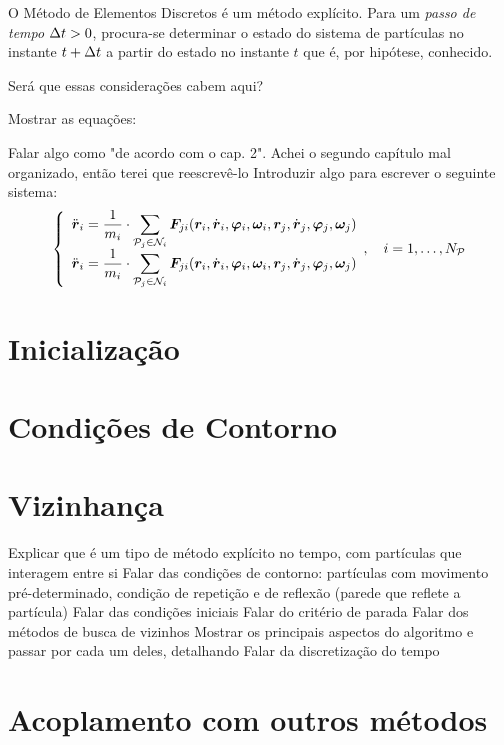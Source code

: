 O Método de Elementos Discretos é um método explícito. Para um \textit{passo de tempo} \(\Delta t>0\), procura-se determinar o estado do sistema de partículas no instante \(t+\Delta t\) a partir do estado no instante \(t\) que é, por hipótese, conhecido.

\alert{Será que essas considerações cabem aqui?}

\alert{Mostrar as equações:}

\alert{Falar algo como "de acordo com o cap. 2". Achei o segundo capítulo mal organizado, então terei que reescrevê-lo}
\alert{Introduzir algo para escrever o seguinte sistema:}
\begin{equation*}
	\left\lbrace
		\begin{array}{l}
			\accelerationi = \inverted{\massi}\cdot\dsum_{\particlej\in\neighborhoodi} \forceji\pqty{\positioni, \velocityi, \orientationi, \angularVelocityi, \positionj, \velocityj, \orientationj, \angularVelocityj}
			\\
			\accelerationi = \inverted{\massi}\cdot\dsum_{\particlej\in\neighborhoodi} \forceji\pqty{\positioni, \velocityi, \orientationi, \angularVelocityi, \positionj, \velocityj, \orientationj, \angularVelocityj}
		\end{array},\quad i = 1, \dots, \numberOfParticles
	\right.
\end{equation*}

\section{Inicialização}

\section{Condições de Contorno} \label{sec:boundary_condition}



\section{Vizinhança} \label{sec:neighborhood}

\alert{Explicar que é um tipo de método explícito no tempo, com partículas que interagem entre si}
\alert{Falar das condições de contorno: partículas com movimento pré-determinado, condição de repetição e de reflexão (parede que reflete a partícula)}
\alert{Falar das condições iniciais}
\alert{Falar do critério de parada}
\alert{Falar dos métodos de busca de vizinhos}
\alert{Mostrar os principais aspectos do algoritmo e passar por cada um deles, detalhando}
\alert{Falar da discretização do tempo}

\section{Acoplamento com outros métodos}
